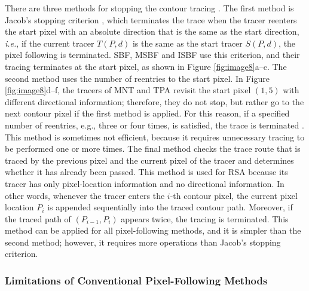 \documentclass[sensors,article,accept,moreauthors,pdftex,10pt,a4paper]{mdpi}
\begin{document}
There are three methods for stopping the contour tracing \cite{Ghuneim2015Contour,Reddy2012Evaluation}. The first method is Jacob's stopping criterion \cite{Ghuneim2015Contour}, which terminates the trace when the tracer reenters the start pixel with an absolute direction that is the same as the start direction, \emph{i.e.}, if the current tracer $T(P,d)$ is the same as the start tracer $S(P,d)$, the pixel following is terminated. SBF, MSBF and ISBF use this criterion, and their tracing terminates at the start pixel, as shown in Figure \ref{fig:image8}a--c. The second method uses the number of reentries to the start pixel. In Figure \ref{fig:image8}d--f, the tracers of MNT and TPA revisit the start pixel $(1, 5)$ with different directional information; therefore, they do not stop, but rather go to the next contour pixel if the first method is applied. For this reason, if a specified number of reentries, e.g., three or four times, is satisfied, the trace is terminated \cite{Reddy2012Evaluation}. This method is sometimes not efficient, because it requires unnecessary tracing to be performed one or more times. The final method checks the trace route that is traced by the previous pixel and the current pixel of the tracer and determines whether it has already been passed. This method is used for RSA \cite{Ghuneim2015Contour,Reddy2012Evaluation} because its tracer has only pixel-location information and no directional information. In other words, whenever the tracer enters the $i$-th contour pixel, the current pixel location $P_i$ is appended sequentially into the traced contour path. Moreover, if the traced path of $(P_{i-1}, P_i)$ appears twice, the tracing is terminated. This method can be applied for all pixel-following methods, and it is simpler than the second method; however, it requires more operations than Jacob's stopping criterion.

\subsubsection{Limitations of Conventional Pixel-Following Methods}
\end{document}
